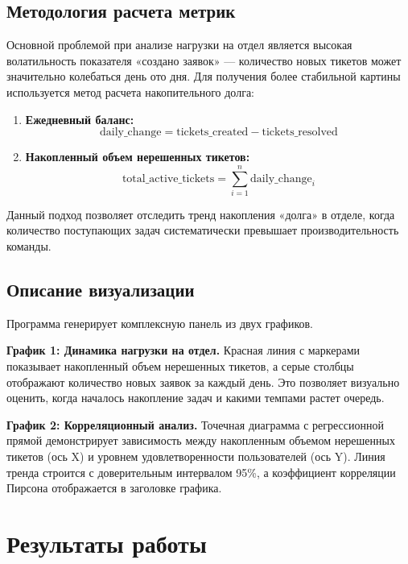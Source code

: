 \documentclass{bmstu}
\begin{document}
\section*{Методология расчета метрик}

Основной проблемой при анализе нагрузки на отдел является высокая волатильность показателя «создано заявок» --- количество новых тикетов может значительно колебаться день ото дня. Для получения более стабильной картины используется метод расчета накопительного долга:

\begin{enumerate}
    \item \textbf{Ежедневный баланс:}
    \[
    \text{daily\_change} = \text{tickets\_created} - \text{tickets\_resolved}
    \]
    
    \item \textbf{Накопленный объем нерешенных тикетов:}
    \[
    \text{total\_active\_tickets} = \sum_{i=1}^{n} \text{daily\_change}_i
    \]
\end{enumerate}

Данный подход позволяет отследить тренд накопления «долга» в отделе, когда количество поступающих задач систематически превышает производительность команды.

\section*{Описание визуализации}

Программа генерирует комплексную панель из двух графиков.

\textbf{График 1: Динамика нагрузки на отдел.} Красная линия с маркерами показывает накопленный объем нерешенных тикетов, а серые столбцы отображают количество новых заявок за каждый день. Это позволяет визуально оценить, когда началось накопление задач и какими темпами растет очередь.

\textbf{График 2: Корреляционный анализ.} Точечная диаграмма с регрессионной прямой демонстрирует зависимость между накопленным объемом нерешенных тикетов (ось X) и уровнем удовлетворенности пользователей (ось Y). Линия тренда строится с доверительным интервалом 95\%, а коэффициент корреляции Пирсона отображается в заголовке графика.

\chapter*{Результаты работы}
\end{document}
